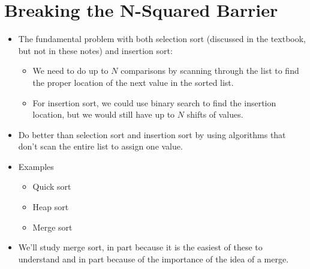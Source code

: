 \documentclass[letterpaper,10pt,english]{sphinxmanual}
\begin{document}
\section{Breaking the N-Squared Barrier}
\label{\detokenize{lecture_notes/lec21_sorting:breaking-the-n-squared-barrier}}\begin{itemize}
\item {} 
The fundamental problem with both selection sort (discussed in the
textbook, but not in these notes) and insertion sort:
\begin{itemize}
\item {} 
We need to do up to \(N\) comparisons by scanning through the
list to find the proper location of the next value in the sorted
list.

\item {} 
For insertion sort, we could use binary search to find the
insertion location, but we would still have up to \(N\) shifts
of values.

\end{itemize}

\item {} 
Do better than selection sort and insertion sort by using algorithms
that don’t scan the entire list to assign one value.

\item {} 
Examples
\begin{itemize}
\item {} 
Quick sort

\item {} 
Heap sort

\item {} 
Merge sort

\end{itemize}

\item {} 
We’ll study merge sort, in part because it is the easiest of these to
understand and in part because of the importance of the idea of a
merge.

\end{itemize}
\end{document}
